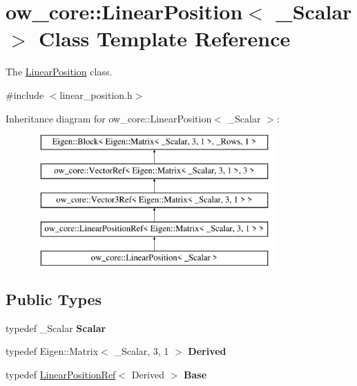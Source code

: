 \hypertarget{classow__core_1_1LinearPosition}{}\section{ow\+\_\+core\+:\+:Linear\+Position$<$ \+\_\+\+Scalar $>$ Class Template Reference}
\label{classow__core_1_1LinearPosition}


The \hyperlink{classow__core_1_1LinearPosition}{Linear\+Position} class.  




{\ttfamily \#include $<$linear\+\_\+position.\+h$>$}

Inheritance diagram for ow\+\_\+core\+:\+:Linear\+Position$<$ \+\_\+\+Scalar $>$\+:\begin{figure}[H]
\begin{center}
\leavevmode
\includegraphics[height=5.000000cm]{d1/db1/classow__core_1_1LinearPosition}
\end{center}
\end{figure}
\subsection*{Public Types}
\begin{DoxyCompactItemize}
\item 
typedef \+\_\+\+Scalar {\bfseries Scalar}\hypertarget{classow__core_1_1LinearPosition_a0102d94ddb84aaf861ce5bcbadcec713}{}\label{classow__core_1_1LinearPosition_a0102d94ddb84aaf861ce5bcbadcec713}

\item 
typedef Eigen\+::\+Matrix$<$ \+\_\+\+Scalar, 3, 1 $>$ {\bfseries Derived}\hypertarget{classow__core_1_1LinearPosition_aa9f7c4a728c84a23a45904622ec6ece7}{}\label{classow__core_1_1LinearPosition_aa9f7c4a728c84a23a45904622ec6ece7}

\item 
typedef \hyperlink{classow__core_1_1LinearPositionRef}{Linear\+Position\+Ref}$<$ Derived $>$ {\bfseries Base}\hypertarget{classow__core_1_1LinearPosition_ab6605ce95de0423dcf22ad80806eb6d0}{}\label{classow__core_1_1LinearPosition_ab6605ce95de0423dcf22ad80806eb6d0}

\end{DoxyCompactItemize}
